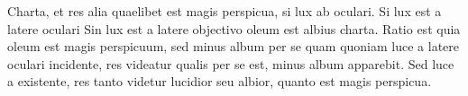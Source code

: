 \pend
\pstart
Charta, 
et res alia quaelibet est magis perspicua, si lux
ab oculari.
\pend
\pstart
Si lux est a latere oculari
%
Sin lux est a latere objectivo oleum est albius charta. Ratio est quia oleum est magis perspicuum, sed minus album per se quam
quoniam luce a latere oculari incidente, res videatur qualis per se est, minus album apparebit. Sed luce a
existente, res tanto videtur lucidior seu albior, quanto est magis perspicua.
\pend
